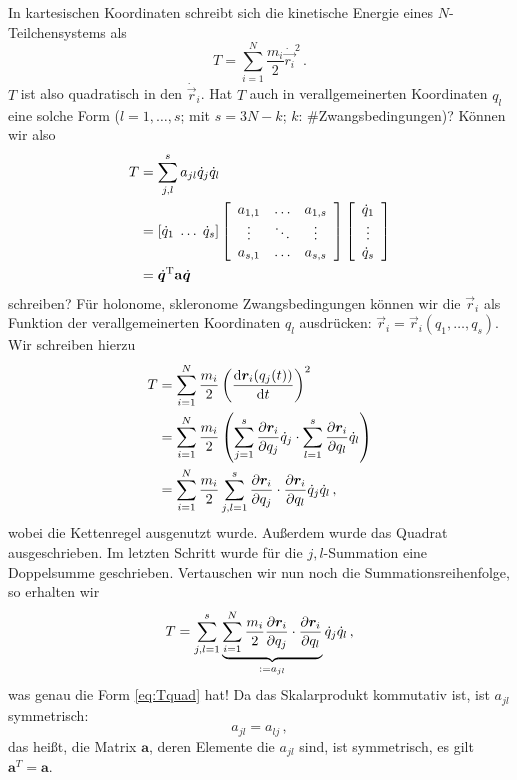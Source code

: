 \documentclass[paper=a4, fontsize=11.0pt, abstractoff, DIV12]{scrartcl}
\begin{document}
In kartesischen Koordinaten schreibt sich die kinetische Energie eines
$N$-Teilchensystems als
\begin{equation}
T = \sum\limits_{i=1}^{N} \frac{m_i}{2} \dot{\vec{r_i}}^2 \, .
\end{equation}
$T$ ist also quadratisch in den $\dot{\vec r}_i$. Hat $T$ auch in
verallgemeinerten Koordinaten $q_l$ eine solche Form ($l=1,\dots,s$; mit $s=3N-k$; $k$:
\#Zwangsbedingungen)? Können wir also
\begin{align}
T &= \sum\limits_{j,l}^{s} a_{jl} \dot{q}_j \dot{q}_l\nonumber\\
&= \left[ \dot{q}_1\; \dots\;\dot{q}_{s} \right] \threeMatrix{a_{1,1}}{\dots}{a_{1,s}}{\vdots}{\ddots}{\vdots}{a_{s,1}}{\dots}{a_{s, s}}
\DreierVec{\dot{q}_{1}}{\vdots}{\dot{q}_{s}}\nonumber\\
&= \dot{\vec{q}}^\mathrm{T} \mathbf{a} \dot{\vec{q}}
\label{eq:Tquad}
\end{align}
schreiben? Für holonome, skleronome Zwangsbedingungen können wir die $\vec r_i$
als Funktion der verallgemeinerten Koordinaten $q_l$ ausdrücken:
$\vec r_i = \vec r_i(q_1, \dots, q_{s})$. Wir schreiben hierzu
\begin{align}
T &=  \sum\limits_{i=1}^{N} \frac{m_i}{2} \left(\frac{\mathrm{d}{\boldsymbol{r}}_i(q_j(t))}{\mathrm{d}t}\right)^2\nonumber\\
&= \sum\limits_{i=1}^{N} \frac{m_i}{2} \left( \sum\limits_{j=1}^{s} \frac{\partial {\ensuremath{\boldsymbol{r}}}_i}{\partial q_j}\dot{q}_j \cdot  \sum\limits_{l=1}^{s} \frac{\partial {\ensuremath{\boldsymbol{r}}}_i}{\partial q_l}\dot{q}_l \right)\nonumber\\
&= \sum\limits_{i=1}^{N} \frac{m_i}{2} \sum\limits_{j,l=1}^{s} \frac{\partial {\ensuremath{\boldsymbol{r}}}_i}{\partial q_j} \cdot \frac{\partial {\ensuremath{\boldsymbol{r}}}_i}{\partial q_l}\dot{q}_j \dot{q}_l \, ,
\end{align}
wobei die Kettenregel ausgenutzt wurde. Außerdem wurde das Quadrat
ausgeschrieben. Im letzten Schritt wurde für die $j,l$-Summation eine
Doppelsumme geschrieben. Vertauschen wir nun noch die Summationsreihenfolge,
so erhalten wir
\begin{equation}
T = \sum\limits_{j,l=1}^{s} \underbrace{\sum\limits_{i=1}^{N} \frac{m_i}{2} \frac{\partial {\ensuremath{\boldsymbol{r}}}_i}{\partial q_j} \cdot \frac{\partial {\ensuremath{\boldsymbol{r}}}_i}{\partial q_l}}_{:=a_{jl}} \dot{q}_j \dot{q}_l \, ,
\end{equation}
was genau die Form \eqref{eq:Tquad} hat! Da das Skalarprodukt kommutativ ist,
ist $a_{jl}$ symmetrisch:
\begin{equation}
a_{jl} = a_{lj}\, ,
\end{equation}
das heißt, die Matrix $\mathbf{a}$, deren Elemente die $a_{jl}$ sind, ist
symmetrisch, es gilt $\mathbf{a}^{T} = \mathbf{a}$.
\end{document}
